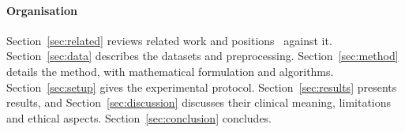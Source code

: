 \paragraph{Organisation} Section~\ref{sec:related} reviews related work and positions \mname\ against it. Section~\ref{sec:data} describes the datasets and preprocessing. Section~\ref{sec:method} details the method, with mathematical formulation and algorithms. Section~\ref{sec:setup} gives the experimental protocol. Section~\ref{sec:results} presents results, and Section~\ref{sec:discussion} discusses their clinical meaning, limitations and ethical aspects. Section~\ref{sec:conclusion} concludes.
